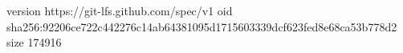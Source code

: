version https://git-lfs.github.com/spec/v1
oid sha256:92206ce722c442276c14ab64381095d1715603339dcf623fed8e68ca53b778d2
size 174916
